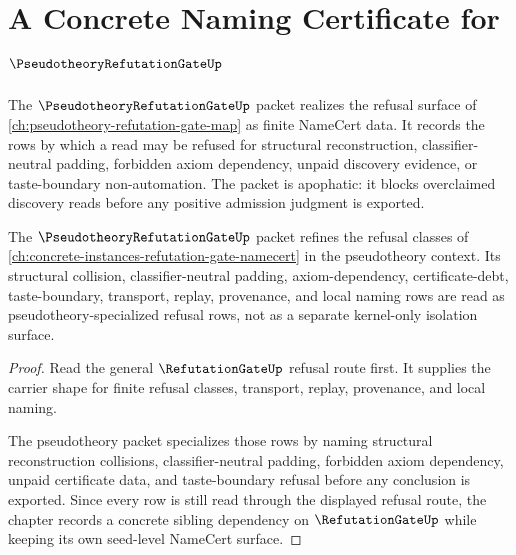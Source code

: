 \chapter{A Concrete Naming Certificate for $\PseudotheoryRefutationGateUp$}
\label{ch:concrete-instances-pseudotheory-refutation-gate-namecert}

The $\PseudotheoryRefutationGateUp$ packet realizes the refusal surface of \autoref{ch:pseudotheory-refutation-gate-map} as finite NameCert data. It records the rows by which a read may be refused for structural reconstruction, classifier-neutral padding, forbidden axiom dependency, unpaid discovery evidence, or taste-boundary non-automation. The packet is apophatic: it blocks overclaimed discovery reads before any positive admission judgment is exported.

\begin{theorem}
\label{thm:pseudotheory-refutation-gate-sibling-dependency-route}
The $\PseudotheoryRefutationGateUp$ packet refines the refusal classes of \autoref{ch:concrete-instances-refutation-gate-namecert} in the pseudotheory context. Its structural collision, classifier-neutral padding, axiom-dependency, certificate-debt, taste-boundary, transport, replay, provenance, and local naming rows are read as pseudotheory-specialized refusal rows, not as a separate kernel-only isolation surface.
\end{theorem}
\begin{proof}
Read the general $\RefutationGateUp$ refusal route first. It supplies the carrier shape for finite refusal classes, transport, replay, provenance, and local naming.

The pseudotheory packet specializes those rows by naming structural reconstruction collisions, classifier-neutral padding, forbidden axiom dependency, unpaid certificate data, and taste-boundary refusal before any conclusion is exported. Since every row is still read through the displayed refusal route, the chapter records a concrete sibling dependency on $\RefutationGateUp$ while keeping its own seed-level NameCert surface.
\end{proof}

